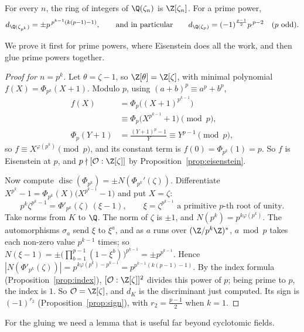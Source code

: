 \begin{theorem}\label{thm:Zzeta}
For every $n$, the ring of integers of $\Q(\zeta_n)$ is $\Z[\zeta_n]$. For a prime power,
\[
d_{\Q(\zeta_{p^k})}=\pm p^{\,p^{k-1}(k(p-1)-1)},\qquad\text{and in particular}\qquad d_{\Q(\zeta_p)}=(-1)^{\frac{p-1}2}p^{\,p-2}
\quad(p\text{ odd}).
\]
\end{theorem}

We prove it first for prime powers, where Eisenstein does all the work, and then glue prime powers together.

\begin{proof}[Proof for $n=p^k$]
Let $\theta=\zeta-1$, so $\Z[\theta]=\Z[\zeta]$, with minimal polynomial $f(X)=\Phi_{p^k}(X+1)$. Modulo $p$, using
$(a+b)^p\equiv a^p+b^p$,
\begin{align*}
f(X)&=\Phi_p\bigl((X+1)^{p^{k-1}}\bigr)\\&\equiv\Phi_p\bigl(X^{p^{k-1}}+1\bigr)\pmod p,\\
\Phi_p(Y+1)&=\frac{(Y+1)^p-1}{Y}\equiv Y^{p-1}\pmod p,
\end{align*}
so $f\equiv X^{\varphi(p^k)}\pmod p$, and its constant term is $f(0)=\Phi_{p^k}(1)=p$. So $f$ is Eisenstein at $p$, and
$p\nmid[\mathcal O:\Z[\zeta]]$ by Proposition~\ref{prop:eisenstein}.

Now compute $\operatorname{disc}(\Phi_{p^k})=\pm N(\Phi_{p^k}'(\zeta))$. Differentiate $X^{p^k}-1=\Phi_{p^k}(X)\bigl(X^{p^{k-1}}
-1\bigr)$ and put $X=\zeta$:
\[
p^k\zeta^{p^k-1}=\Phi'_{p^k}(\zeta)\,(\xi-1),\qquad \xi=\zeta^{p^{k-1}}\text{ a primitive $p$-th root of unity}.
\]
Take norms from $K$ to $\Q$. The norm of $\zeta$ is $\pm1$, and $N(p^k)=p^{k\varphi(p^k)}$. The automorphisms $\sigma_a$ send
$\xi$ to $\xi^a$, and as $a$ runs over $(\Z/p^k\Z)^*$, $a\bmod p$ takes each non-zero value $p^{k-1}$ times; so
$N(\xi-1)=\pm\bigl(\prod_{b=1}^{p-1}(1-\xi^b)\bigr)^{p^{k-1}}=\pm p^{p^{k-1}}$. Hence
$|N(\Phi'_{p^k}(\zeta))|=p^{k\varphi(p^k)-p^{k-1}}=p^{p^{k-1}(k(p-1)-1)}$. By the index formula (Proposition~\ref{prop:index}),
$[\mathcal O:\Z[\zeta]]^2$ divides this power of $p$; being prime to $p$, the index is $1$. So $\mathcal O=\Z[\zeta]$, and $d_K$
is the discriminant just computed. Its sign is $(-1)^{r_2}$ (Proposition~\ref{prop:sign}), with $r_2=\frac{p-1}2$ when
$k=1$.
\end{proof}

For the gluing we need a lemma that is useful far beyond cyclotomic fields.

